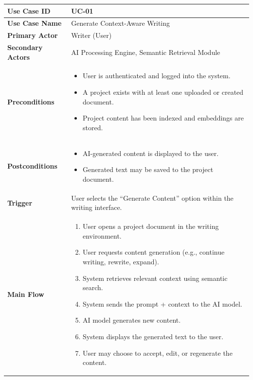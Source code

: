 \begin{table}[H]
\centering
\begin{tabular}{|p{3cm}|p{13cm}|}
\hline
\textbf{Use Case ID} & UC-01 \\ \hline
\textbf{Use Case Name} & Generate Context-Aware Writing \\ \hline
\textbf{Primary Actor} & Writer (User) \\ \hline
\textbf{Secondary Actors} & AI Processing Engine, Semantic Retrieval Module \\ \hline
\textbf{Preconditions} & 
\begin{itemize}
    \item User is authenticated and logged into the system.
    \item A project exists with at least one uploaded or created document.
    \item Project content has been indexed and embeddings are stored.
\end{itemize} \\ \hline

\textbf{Postconditions} &
\begin{itemize}
    \item AI-generated content is displayed to the user.
    \item Generated text may be saved to the project document.
\end{itemize} \\ \hline

\textbf{Trigger} & 
User selects the ``Generate Content'' option within the writing interface. \\ \hline

\textbf{Main Flow} &
\begin{enumerate}
    \item User opens a project document in the writing environment.
    \item User requests content generation (e.g., continue writing, rewrite, expand).
    \item System retrieves relevant context using semantic search.
    \item System sends the prompt + context to the AI model.
    \item AI model generates new content.
    \item System displays the generated text to the user.
    \item User may choose to accept, edit, or regenerate the content.
\end{enumerate} \\ \hline


\end{tabular}
\end{table}
